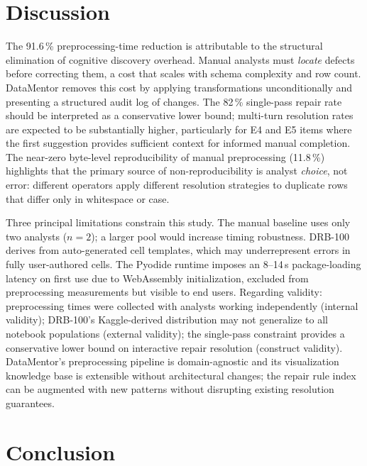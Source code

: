 \documentclass[conference]{IEEEtran}
\begin{document}
\section{Discussion}
\label{sec:discussion}

The 91.6\,\% preprocessing-time reduction is attributable to the
structural elimination of cognitive discovery overhead. Manual analysts
must \emph{locate} defects before correcting them, a cost that scales
with schema complexity and row count. DataMentor removes this cost by
applying transformations unconditionally and presenting a structured
audit log of changes. The 82\,\% single-pass repair rate should be
interpreted as a conservative lower bound; multi-turn resolution rates
are expected to be substantially higher, particularly for E4 and E5
items where the first suggestion provides sufficient context for informed
manual completion. The near-zero byte-level reproducibility of manual
preprocessing (11.8\,\%) highlights that the primary source of
non-reproducibility is analyst \emph{choice}, not error: different
operators apply different resolution strategies to duplicate rows that
differ only in whitespace or case.

Three principal limitations constrain this study. The manual baseline
uses only two analysts ($n=2$); a larger pool would increase timing
robustness. DRB-100 derives from auto-generated cell templates, which
may underrepresent errors in fully user-authored cells. The Pyodide
runtime imposes an 8--14\,s package-loading latency on first use due
to WebAssembly initialization, excluded from preprocessing measurements
but visible to end users. Regarding validity: preprocessing times were
collected with analysts working independently (internal validity);
DRB-100's Kaggle-derived distribution may not generalize to all notebook
populations (external validity); the single-pass constraint provides a
conservative lower bound on interactive repair resolution (construct
validity). DataMentor's preprocessing pipeline is domain-agnostic and
its visualization knowledge base is extensible without architectural
changes; the repair rule index can be augmented with new patterns
without disrupting existing resolution guarantees.

\section{Conclusion}
\label{sec:conclusion}
\end{document}
